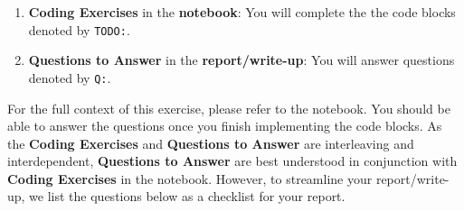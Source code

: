 \documentclass{article}
\begin{document}
\begin{enumerate}
    \item \textbf{Coding Exercises} in the \textbf{notebook}: You will complete
    the the code blocks denoted by \texttt{TODO:}.
    \item \textbf{Questions to Answer} in the \textbf{report/write-up}: You will
    answer questions denoted by \texttt{Q:}.
\end{enumerate}

For the full context of this exercise, please refer to the notebook. You should
be able to answer the questions once you finish implementing the code blocks. As
the \textbf{Coding Exercises} and \textbf{Questions to Answer} are interleaving
and interdependent, \textbf{Questions to Answer} are best understood in
conjunction with \textbf{Coding Exercises} in the notebook. However, to
streamline your report/write-up, we list the questions below as a checklist for
your report.
\end{document}
